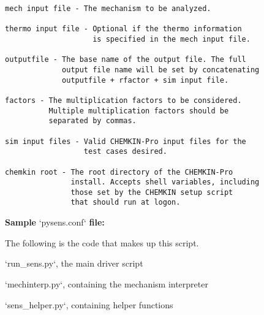\begin{singlespace}
{\begin{Verbatim}
mech input file - The mechanism to be analyzed.

thermo input file - Optional if the thermo information
                    is specified in the mech input file.

outputfile - The base name of the output file. The full
             output file name will be set by concatenating
             outputfile + rfactor + sim input file.

factors - The multiplication factors to be considered.
          Multiple multiplication factors should be
          separated by commas.

sim input files - Valid CHEMKIN-Pro input files for the
                  test cases desired.

chemkin root - The root directory of the CHEMKIN-Pro
               install. Accepts shell variables, including
               those set by the CHEMKIN setup script
               that should run at logon.
\end{Verbatim}

{\large \textbf{Sample} `pysens.conf` \textbf{file:}}

The following is the code that makes up this script.

\cleardoublepage

{\Large `run\_sens.py`, the main driver script}


\cleardoublepage

{\Large `mechinterp.py`, containing the mechanism interpreter}


\cleardoublepage

{\Large `sens\_helper.py`, containing helper functions}

}
\end{singlespace}
